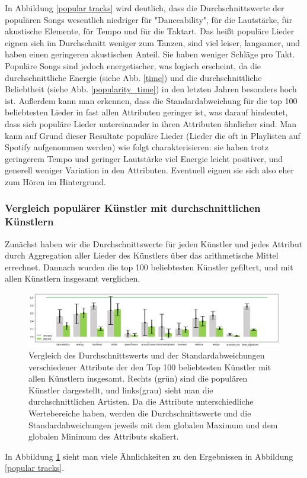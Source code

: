 \documentclass[conference]{IEEEtran}
\begin{document}
In Abbildung \ref{popular tracks} wird deutlich, dass die Durchschnittswerte der populären Songs wesentlich niedriger für "Danceability", für die Lautstärke, für akustische Elemente, für Tempo und für die Taktart. Das heißt populäre Lieder eignen sich im Durchschnitt weniger zum Tanzen, sind viel leiser, langsamer, und haben einen geringeren akustischen Anteil. Sie haben weniger Schläge pro Takt. Populäre Songs sind jedoch energetischer, was logisch erscheint, da die durchschnittliche Energie (siehe Abb. \ref{time}) und die durchschnittliche Beliebtheit (siehe Abb. \ref{popularity_time}) in den letzten Jahren besonders hoch ist.
Außerdem kann man erkennen, dass die Standardabweichung für die top 100 beliebtesten Lieder in fast allen Attributen geringer ist, was darauf hindeutet, dass sich populäre Lieder untereinander in ihren Attributen ähnlicher sind.
Man kann auf Grund dieser Resultate populäre Lieder (Lieder die oft in Playlisten auf Spotify aufgenommen werden) wie folgt charakterisieren: sie haben trotz geringerem Tempo und geringer Lautstärke viel Energie leicht positiver, und generell weniger Variation in den Attributen. Eventuell eignen sie sich also eher zum Hören im Hintergrund. 

\subsubsection{Vergleich populärer Künstler mit durchschnittlichen Künstlern}

Zunächst haben wir die Durchschnittswerte für jeden Künstler und jedes Attribut durch Aggregation aller Lieder des Künstlers über das arithmetische Mittel errechnet. Dannach wurden die top 100 beliebtesten Künstler gefiltert, und mit allen Künstlern insgesamt verglichen.

\begin{figure}[t]
\centering
\includegraphics[width=\textwidth]{images/pop_arts.png}
\caption{Vergleich des Durchschnittswerts und der Standardabweichungen verschiedener Attribute der den Top 100 beliebtesten Künstler mit allen Künstlern insgesamt. Rechts (grün) sind die populären Künstler dargestellt, und links(grau) sieht man die durchschnittlichen Artisten. Da die Attribute unterschiedliche Wertebereiche haben, werden die Durchschnittswerte und die Standardabweichungen jeweils mit dem globalen Maximum und dem globalen Minimum des Attributs skaliert.}
\label{popular artists}
\end{figure}
In Abbildung \ref{popular artists} sieht man viele Ähnlichkeiten zu den Ergebnissen in Abbildung \ref{popular tracks}.
\end{document}
